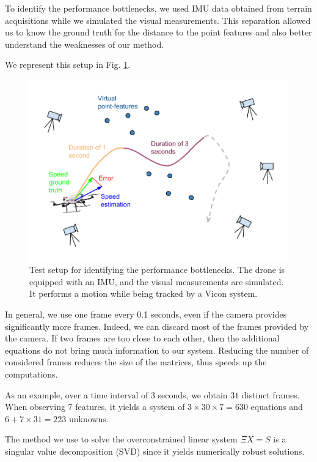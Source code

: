 \documentclass[letterpaper, 10 pt, conference]{ieeeconf}  %
\begin{document}
To identify the performance bottlenecks, we used IMU data obtained from terrain acquisitions
while we simulated the visual measurements.
This separation allowed us to know the ground truth for the distance to the point features
and also better understand the weaknesses of our method.

We represent this setup in Fig. \ref{fig:testsetup}.

\begin{figure}
  \centering
  \includegraphics[width=\columnwidth]{images/setupTestDroneError.png}
  \caption{Test setup for identifying the performance bottlenecks.
    The drone is equipped with an IMU, and the visual measurements are simulated.
    It performs a motion while being tracked by a Vicon system.\label{fig:testsetup}}
\end{figure}

In general, we use one frame every 0.1 seconds, even if the camera provides significantly more frames.
Indeed, we can discard most of the frames provided by the camera.
If two frames are too close to each other, then the additional equations do not bring much information to our system.
Reducing the number of considered frames reduces the size of the matrices, thus speeds up the computations.

As an example, over a time interval of 3 seconds, we obtain $31$ distinct frames.
When observing 7 features, it yields a system of $3\times 30\times 7 = 630$ equations and $6+7\times 31=223$ unknowns.

The method we use to solve the overconstrained linear system $\Xi X = S$ is a singular value decomposition (SVD) since it yields numerically robust solutions.
\end{document}
